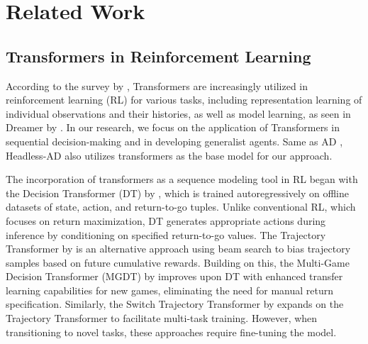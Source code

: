 \section{Related Work}
\label{appendix:related_work}

\subsection{Transformers in Reinforcement Learning}
According to the survey by \citet{li2023survey}, Transformers \citep{vaswani2017attention} are increasingly utilized in reinforcement learning (RL) for various tasks, including representation learning of individual observations and their histories, as well as model learning, as seen in Dreamer by \citet{hafner2019dream}. In our research, we focus on the application of Transformers in sequential decision-making and in developing generalist agents. Same as AD \citep{laskin2022context}, Headless-AD also utilizes transformers as the base model for our approach.

The incorporation of transformers as a sequence modeling tool in RL began with the Decision Transformer (DT) by \citep{hu2022transforming}, which is trained autoregressively on offline datasets of state, action, and return-to-go tuples. Unlike conventional RL, which focuses on return maximization, DT generates appropriate actions during inference by conditioning on specified return-to-go values. The Trajectory Transformer by \citet{janner2021offline} is an alternative approach using beam search to bias trajectory samples based on future cumulative rewards. Building on this, the Multi-Game Decision Transformer (MGDT) by \citet{lee2022multi} improves upon DT with enhanced transfer learning capabilities for new games, eliminating the need for manual return specification. Similarly, the Switch Trajectory Transformer by \citep{lin2022switch} expands on the Trajectory Transformer to facilitate multi-task training. However, when transitioning to novel tasks, these approaches require fine-tuning the model.



